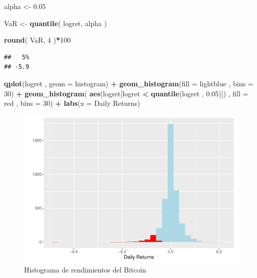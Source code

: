 \documentclass[
]{book}
\newenvironment{Shaded}{\begin{snugshade}}{\end{snugshade}}
\newcommand{\AttributeTok}[1]{\textcolor[rgb]{0.13,0.29,0.53}{#1}}
\newcommand{\DecValTok}[1]{\textcolor[rgb]{0.00,0.00,0.81}{#1}}
\newcommand{\FloatTok}[1]{\textcolor[rgb]{0.00,0.00,0.81}{#1}}
\newcommand{\FunctionTok}[1]{\textcolor[rgb]{0.13,0.29,0.53}{\textbf{#1}}}
\newcommand{\NormalTok}[1]{#1}
\newcommand{\OtherTok}[1]{\textcolor[rgb]{0.56,0.35,0.01}{#1}}
\newcommand{\SpecialCharTok}[1]{\textcolor[rgb]{0.81,0.36,0.00}{\textbf{#1}}}
\newcommand{\StringTok}[1]{\textcolor[rgb]{0.31,0.60,0.02}{#1}}
\begin{document}
\begin{Shaded}
\begin{Highlighting}[]
\NormalTok{alpha }\OtherTok{\textless{}{-}} \FloatTok{0.05}

\NormalTok{VaR }\OtherTok{\textless{}{-}} \FunctionTok{quantile}\NormalTok{( logret, alpha )}

\FunctionTok{round}\NormalTok{( VaR, }\DecValTok{4}\NormalTok{ )}\SpecialCharTok{*}\DecValTok{100}
\end{Highlighting}
\end{Shaded}

\begin{verbatim}
##   5% 
## -5.9
\end{verbatim}

\begin{Shaded}
\begin{Highlighting}[]
\FunctionTok{qplot}\NormalTok{(logret , }\AttributeTok{geom =} \StringTok{\textquotesingle{}histogram\textquotesingle{}}\NormalTok{) }\SpecialCharTok{+} 
  \FunctionTok{geom\_histogram}\NormalTok{(}\AttributeTok{fill =} \StringTok{\textquotesingle{}lightblue\textquotesingle{}}\NormalTok{ , }\AttributeTok{bins =} \DecValTok{30}\NormalTok{) }\SpecialCharTok{+}
  \FunctionTok{geom\_histogram}\NormalTok{( }\FunctionTok{aes}\NormalTok{(logret[logret }\SpecialCharTok{\textless{}} \FunctionTok{quantile}\NormalTok{(logret , }\FloatTok{0.05}\NormalTok{)]) , }
                  \AttributeTok{fill =} \StringTok{\textquotesingle{}red\textquotesingle{}}\NormalTok{ , }\AttributeTok{bins =} \DecValTok{30}\NormalTok{) }\SpecialCharTok{+}
  \FunctionTok{labs}\NormalTok{(}\AttributeTok{x =} \StringTok{\textquotesingle{}Daily Returns\textquotesingle{}}\NormalTok{)}
\end{Highlighting}
\end{Shaded}

\begin{figure}

{\centering \includegraphics{Notas-Series-Tiempo_files/figure-latex/fig103-1} 

}

\caption{Histograma de rendimientos del Bitcoin}\label{fig:fig103}
\end{figure}
\end{document}
